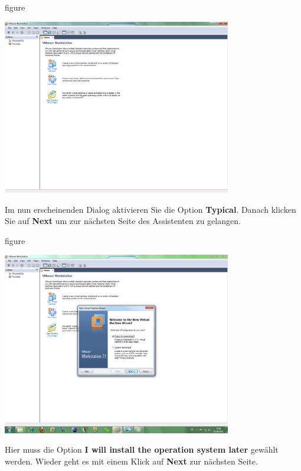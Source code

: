 \begin{nofloat}{figure}
\begin{center}
\includegraphics[width=0.75\textwidth]{screenshots/vm01.png}
\end{center}
\end{nofloat}

Im nun erscheinenden Dialog aktivieren Sie die Option \textbf{Typical}. Danach klicken Sie auf \textbf{Next} um zur nächsten Seite des Assistenten
zu gelangen.

\begin{nofloat}{figure}
\begin{center}
\includegraphics[width=0.75\textwidth]{screenshots/vm02.png}
\end{center}
\end{nofloat}

Hier muss die Option \textbf{I will install the operation system later} gewählt werden. Wieder geht es mit einem
Klick auf \textbf{Next} zur nächsten Seite.

